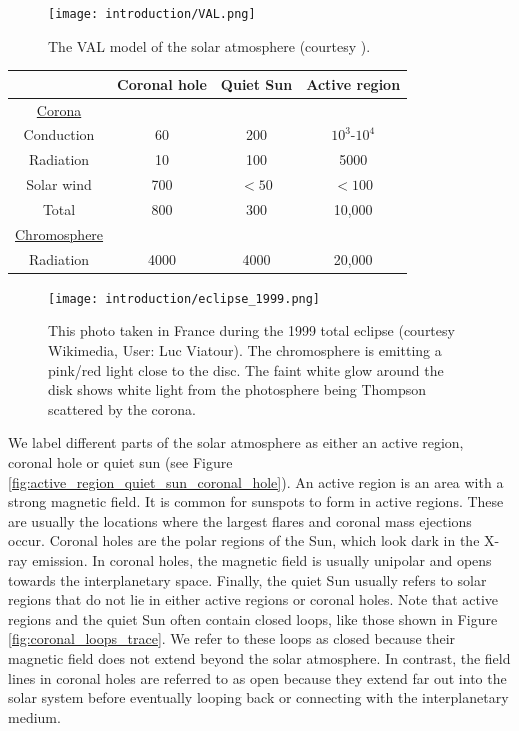 \begin{figure}[!htp]
    \centering
    \texttt{[image: introduction/VAL.png]}
    \caption{The VAL model \citep{Vernazza1981} of the solar atmosphere (courtesy \citet{Williams2018}).}
    \label{fig:VAL_atmosphere}
\end{figure}

\begin{table}[!htp]
    \centering
    \begin{tabular}{c c c c}
        \hline
         & Coronal hole & Quiet Sun & Active region \\
        \hline
        \underline{Corona}  \\
        Conduction & 60 & 200 & $10^3\text{-}10^4$ \\
        Radiation & 10 & 100 & 5000 \\
        Solar wind & 700 & $<50$ & $<100$ \\
        \hline
        Total & 800 & 300 & 10,000 \\
        \hline
        \underline{Chromosphere} \\
        Radiation & 4000 & 4000 & 20,000
        
    \end{tabular}
    \label{tab:energy_losses_corona_chromosphere}
\end{table}

\begin{figure}[!htp]
    \centering
    \texttt{[image: introduction/eclipse\_1999.png]}
    \caption{This photo taken in France during the 1999 total eclipse (courtesy Wikimedia, User: Luc Viatour). The chromosphere is emitting a pink/red light close to the disc. The faint white glow around the disk shows white light from the photosphere being Thompson scattered by the corona.}
    \label{fig:total_eclipse1999}
\end{figure}

We label different parts of the solar atmosphere as either an active region, coronal hole or quiet sun (see Figure \ref{fig:active_region_quiet_sun_coronal_hole}). An active region is an area with a strong magnetic field. It is common for sunspots to form in active regions. These are usually the locations where the largest flares and coronal mass ejections occur. Coronal holes are the polar regions of the Sun, which look dark in the X-ray emission. In coronal holes, the magnetic field is usually unipolar and opens towards the interplanetary space. Finally, the quiet Sun usually refers to solar regions that do not lie in either active regions or coronal holes. Note that active regions and the quiet Sun often contain closed loops, like those shown in Figure \ref{fig:coronal_loops_trace}. We refer to these loops as closed because their magnetic field does not extend beyond the solar atmosphere. In contrast, the field lines in coronal holes are referred to as open because they extend far out into the solar system before eventually looping back or connecting with the interplanetary medium.

